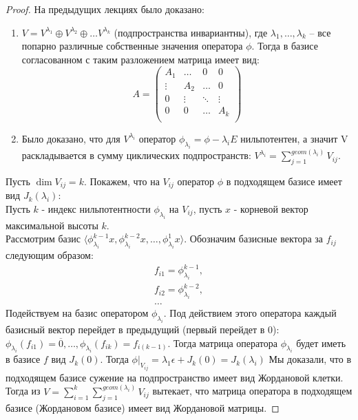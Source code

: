 \begin{proof}
    На предыдущих лекциях было доказано:
    \begin{enumerate}
        \item $V = V^{\lambda_1} \oplus V^{\lambda_2} \oplus \dots V^{\lambda_k}$ (подпространства инвариантны), где $\lambda_1, \dots, \lambda_k$ -- все попарно различные собственные значения оператора $\phi$. Тогда в базисе согласованном с таким разложением матрица имеет вид:
         \[A = \begin{pmatrix}
            A_1      & \dots      & 0    & 0 \\
            \vdots      & A_2      & \dots   & 0 \\
            0   & \vdots     & \ddots    & \vdots \\
            0      & 0      & \dots    & A_k \\
            \end{pmatrix}\]
        \item Было доказано, что для $V^{\lambda_i}$ оператор $\phi_{\lambda_i} = \phi - \lambda_i E$ нильпотентен, а значит V 
        раскладывается в сумму циклических подпространств: $V^{\lambda_i} = \displaystyle\sum_{j = 1}^{geom(\lambda_i)} V_{ij}$.
    \end{enumerate}
    Пусть $\dim V_{ij} = k$. Покажем, что на $V_{ij}$ оператор $\phi$ в подходящем базисе имеет вид $J_k(\lambda_i)$:\\ 
    Пусть $k$ - индекс нильпотентности $\phi_{\lambda_i}$ на $V_{ij}$, пусть $x$ - корневой вектор максимальной высоты $k$.\\
    Рассмотрим базис $\langle \phi_{\lambda_i}^{k-1} x, \phi_{\lambda_i}^{k-2} x, \dots, \phi_{\lambda_i}^{1} x \rangle$. 
    Обозначим базисные вектора за $f_{ij}$ следующим образом:
    \begin{gather*}
        f_{i1} = \phi_{\lambda_i}^{k - 1},\\
        f_{i2} = \phi_{\lambda_i}^{k - 2},\\
        \dots
    \end{gather*}
    Подействуем на базис оператором $\phi_{\lambda_i}$. Под действием этого оператора каждый базисный 
    вектор перейдет в предыдущий (первый перейдет в $0$): $\phi_{\lambda_i}(f_{i1}) = \overline{0}, \dots, \phi_{\lambda_i}(f_{ik}) = f_{i(k - 1)}$. 
    Тогда матрица оператора $\phi_{\lambda_i}$ будет иметь в базисе $f$ вид $J_k(0)$.
    Тогда $\phi \vert_{V_{ij}} = \lambda_1 \epsilon + J_k(0) = J_k(\lambda_i)$
    Мы доказали, что в подходящем базисе сужение на подпространство имеет вид Жордановой клетки. Тогда из
    $V = \displaystyle\sum_{i = 1}^{k} \displaystyle\sum_{j = 1}^{geom(\lambda_i)} V_{ij}$
    вытекает, что матрица оператора в подходящем базисе (Жордановом базисе) имеет вид Жордановой матрицы.
\end{proof}


